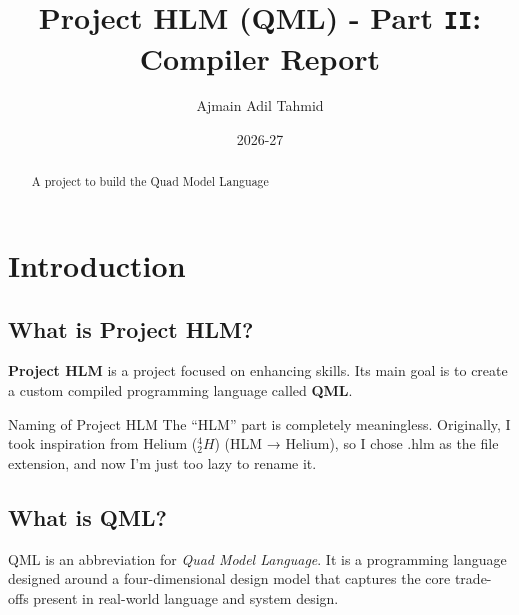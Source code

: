 \documentclass[12pt]{report}
\title{Project HLM (QML) - Part \textbf{\texttt{II}}: Compiler Report}
\author{Ajmain Adil Tahmid}
\date{2026-27}
\newcommand{\funfact}[2]{\begin{funfactbox}{#1} #2 \end{funfactbox}}
\begin{document}
	
	\maketitle
	
	\begin{abstract}
		\begin{center}
			A project to build the Quad Model Language
		\end{center}
	\end{abstract}
	
	\newpage
	
	\tableofcontents
	
	\newpage
	
	\chapter{Introduction}
	\label{sec:intro}
	\section{What is Project HLM?}
	\textbf{Project HLM} is a project focused on enhancing skills. Its main goal is to create a custom compiled programming language called \textbf{QML}.
	
	\vspace{1.5em}
	
	
	
	\begin{funfactbox}{Naming of Project HLM}
		The “HLM” part is completely meaningless. Originally, I took inspiration from Helium ($^4_2H$)  (HLM → Helium), so I chose .hlm as the file extension, and now I’m just too lazy to rename it.
	\end{funfactbox}
	
	\vspace{0.5em}
	
	\section{What is QML?}
	QML is an abbreviation for \textit{Quad Model Language}. It is a programming language designed around a four-dimensional design model that captures the core trade-offs present in real-world language and system design.
	
	
\end{document}

